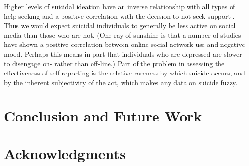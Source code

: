 \documentclass[11pt]{article}
\begin{document}
Higher levels of suicidal ideation have an inverse relationship with all types of help-seeking and a positive correlation with the decision to not seek support \cite{deane2001suicidal}. Thus we would expect suicidal individuals to generally be less active on social media than those who are not. (One ray of sunshine is that a number of studies have shown a positive correlation between online social network use and negative mood. Perhaps this means in part that individuals who are depressed are slower to disengage on- rather than off-line.)
 Part of the problem in assessing the effectiveness of self-reporting is the relative rareness by which suicide occurs, and by the inherent subjectivity of the act, which makes any data on suicide fuzzy.
 
\section{Conclusion and Future Work}
\section*{Acknowledgments}





\end{document}
